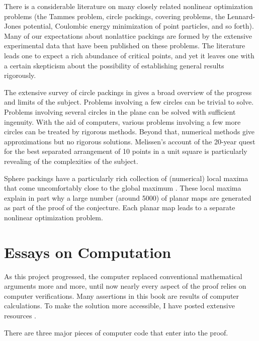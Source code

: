 There is a considerable literature on many closely related nonlinear
optimization problems (the Tammes problem, circle packings, covering
problems, the Lennard-Jones potential, Coulombic energy minimization
of point particles, and so forth). Many of our expectations about
nonlattice packings are formed by the extensive experimental data
that have been published on these problems. The literature leads one
to expect a rich abundance of critical points, and yet it leaves one
with a certain skepticism about the possibility of establishing
general results rigorously.

The extensive survey of circle packings
in \cite{Mel97} gives a broad overview of the progress and limits
of the subject.
Problems involving a few circles can be
trivial to solve.
Problems involving several circles in the plane can be solved with
sufficient ingenuity.
With the aid of computers, various  problems involving
a few more circles can be
treated by rigorous methods.
Beyond that, numerical methods
give approximations but no rigorous solutions.
Melissen's account of
the 20-year quest for the best separated arrangement of 10
points in a unit square is particularly revealing of the complexities
of the subject.

Sphere packings have a particularly rich collection of (numerical)
local maxima that come uncomfortably close to the global maximum
\cite{spp}. These local maxima explain in part why a large number
(around 5000) of planar maps are generated as part of the proof of
the conjecture.  Each planar map leads to a separate nonlinear
optimization problem.








\chapter{Essays on Computation}


As this project  progressed, the computer  replaced conventional
mathematical arguments more and more, until now
 nearly every aspect of the proof relies on
computer verifications.  Many assertions in this book
 are results of computer calculations.
To make the solution more accessible, I have
posted extensive resources \cite{web}.

There are three major pieces of computer code that enter into the proof.

